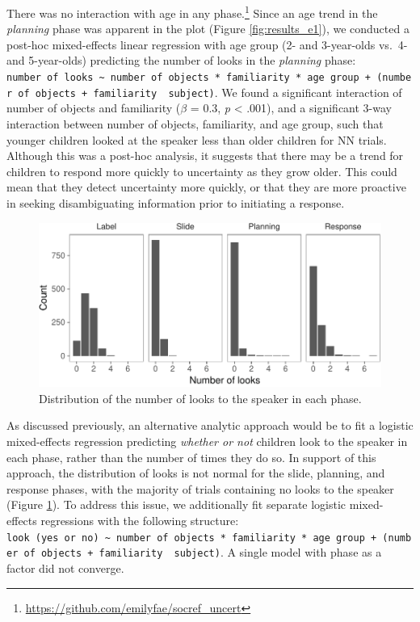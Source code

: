\documentclass[a4paper,man,apacite,floatsintext]{apa6}
\newenvironment{CodeChunk}{}{}
\begin{document}
There was no interaction with age in any phase.\footnote{\url{https://github.com/emilyfae/socref_uncert}}
Since an age trend in the \emph{planning} phase was apparent in the plot
(Figure \ref{fig:results_e1}), we conducted a post-hoc mixed-effects
linear regression with age group (2- and 3-year-olds vs.~4- and
5-year-olds) predicting the number of looks in the \emph{planning}
phase:
\texttt{number\ of\ looks\ \textasciitilde{}\ number\ of\ objects\ *\ familiarity\ *\ age\ group\ +\ (number\ of\ objects\ +\ familiarity\ \textbar{}\ subject)}.
We found a significant interaction of number of objects and familiarity
(\(\beta\) = 0.3, \emph{p} \textless{} .001), and a significant 3-way
interaction between number of objects, familiarity, and age group, such
that younger children looked at the speaker less than older children for
NN trials. Although this was a post-hoc analysis, it suggests that there
may be a trend for children to respond more quickly to uncertainty as
they grow older. This could mean that they detect uncertainty more
quickly, or that they are more proactive in seeking disambiguating
information prior to initiating a response.

\begin{CodeChunk}
\begin{figure}[b]

{\centering \includegraphics{figs/hist_e1-1} 

}

\caption[Distribution of the number of looks to the speaker in each phase]{Distribution of the number of looks to the speaker in each phase.}\label{fig:hist_e1}
\end{figure}
\end{CodeChunk}

As discussed previously, an alternative analytic approach would be to
fit a logistic mixed-effects regression predicting \emph{whether or not}
children look to the speaker in each phase, rather than the number of
times they do so. In support of this approach, the distribution of looks
is not normal for the slide, planning, and response phases, with the
majority of trials containing no looks to the speaker (Figure
\ref{fig:hist_e1}). To address this issue, we additionally fit separate
logistic mixed-effects regressions with the following structure:
\texttt{look\ (yes\ or\ no)\ \textasciitilde{}\ number\ of\ objects\ *\ familiarity\ *\ age\ group\ +\ (number\ of\ objects\ +\ familiarity\ \textbar{}\ subject)}.
A single model with phase as a factor did not converge.
\end{document}
